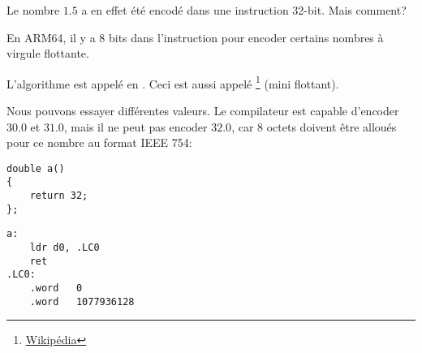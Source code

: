 Le nombre $1.5$ a en effet été encodé dans une instruction 32-bit.
Mais comment?

En ARM64, il y a 8 bits dans l'instruction  pour encoder certains nombres
à virgule flottante.

L'algorithme est appelé  en \ARMSixFourRefURL.
Ceci est aussi appelé \footnote{\href{http://go.yurichev.com/17139}{Wikipédia}}
(mini flottant).

Nous pouvons essayer différentes valeurs. Le compilateur est capable d'encoder $30.0$
et $31.0$, mais il ne peut pas encoder $32.0$, car 8 octets doivent être alloués
pour ce nombre au format IEEE 754:

\begin{lstlisting}[style=customc]
double a()
{
	return 32;
};
\end{lstlisting}

\begin{lstlisting}[caption=GCC 4.9.1 -O3,style=customasmARM]
a:
	ldr	d0, .LC0
	ret
.LC0:
	.word	0
	.word	1077936128
\end{lstlisting}
